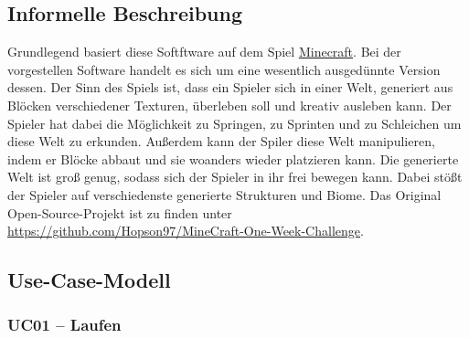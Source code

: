 \documentclass{article}
\begin{document}
\subsection{Informelle Beschreibung} \label{subsec:inf}

Grundlegend basiert diese Softftware auf dem Spiel \href{https://www.minecraft.net}{Minecraft}. Bei der vorgestellen Software handelt es sich um eine wesentlich ausgedünnte Version dessen. Der Sinn des Spiels ist, dass ein Spieler sich in einer Welt, generiert aus Blöcken verschiedener Texturen, überleben soll und kreativ ausleben kann. Der Spieler hat dabei die Möglichkeit zu Springen, zu Sprinten und zu Schleichen um diese Welt zu erkunden. Außerdem kann der Spiler diese Welt manipulieren, indem er Blöcke abbaut und sie woanders wieder platzieren kann. Die generierte Welt ist groß genug, sodass sich der Spieler in ihr frei bewegen kann. Dabei stößt der Spieler auf verschiedenste generierte Strukturen und Biome. Das Original Open-Source-Projekt ist zu finden unter \url{https://github.com/Hopson97/MineCraft-One-Week-Challenge}.

\subsection{Use-Case-Modell} \label{subsec:usecase}

\begin{center}
\end{center}

\subsubsection*{UC01 – Laufen}
\end{document}
